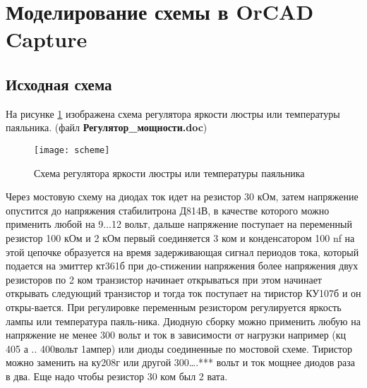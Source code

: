 





\tableofcontents
\newpage

\section{Моделирование схемы в OrCAD Capture}

\subsection{Исходная схема}

На рисунке \ref{pic:scheme} изображена схема регулятора яркости люстры или температуры паяльника. (файл \textbf{Регулятор\_мощности.doc})

\begin{figure}[H]
\begin{center}
	\texttt{[image: scheme]}
	\caption{Схема регулятора яркости люстры или температуры паяльника}
	\label{pic:scheme}
\end{center}
\end{figure}

Через мостовую схему на диодах ток идет на резистор 30 кОм, затем напряжение опустится до напряжения стабилитрона Д814В, в качестве которого можно применить любой на 9$\dots$12 вольт, дальше напряжение поступает на переменный резистор 100 кОм и 2 кОм первый соединяется 3 ком и конденсатором 100 nf на этой цепочке образуется на время задерживающая сигнал периодов тока, который подается на эмиттер кт361б при до-стижении напряжения более напряжения двух резисторов по 2 ком транзистор начинает открываться при этом начинает открывать следующий транзистор и тогда ток поступает на тиристор    КУ107б и он откры-вается. При регулировке переменным резистором регулируется яркость лампы или температура паяль-ника. Диодную сборку можно применить любую на напряжение не менее 300 вольт и ток в зависимости от нагрузки например (кц 405 а .. 400вольт 1ампер) или диоды соединенные по мостовой схеме. Тиристор можно заменить на ку208г или другой 300….*** вольт и ток мощнее диодов раза в два. Еще надо чтобы резистор 30 ком был 2 вата.

